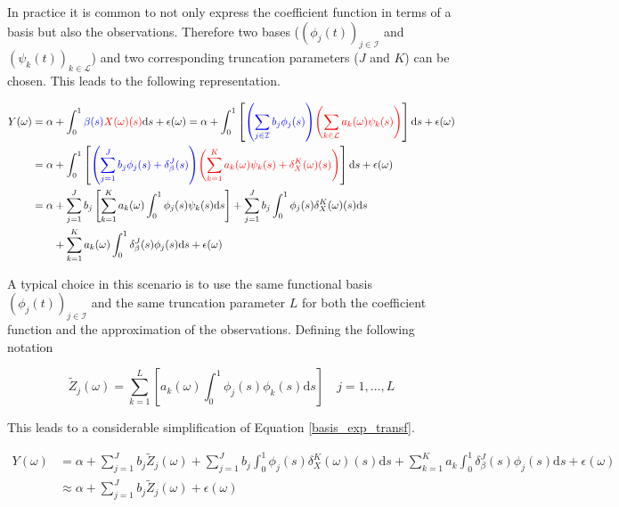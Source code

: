 \documentclass[11pt,twoside,a4paper]{article}
\begin{document}
	In practice it is common to not only express the coefficient function in terms of a basis but also the observations. Therefore two bases ($\left(\phi_j(t)\right)_{j \in \mathcal{I}}$ and $\left(\psi_k(t)\right)_{k \in \mathcal{L}}$) and two corresponding truncation parameters ($J$ and $K$) can be chosen. This leads to the following representation.
	
	\begin{equation}\label{basis_exp_transf}
		\begin{split}
			Y(\omega) & = \alpha + \int_{0}^{1} {\color{blue}\beta(s)} {\color{red}X(\omega)(s)}\mathrm{d}s + \epsilon(\omega)
			 = \alpha + \int_{0}^{1}\left[{\color{blue}\left(\sum_{j \in \mathcal{I}} b_j  \phi_j(s)\right)} {\color{red}\left(\sum_{k \in \mathcal{L}} a_k(\omega)  \psi_k(s)\right)} \right]\mathrm{d}s + \epsilon(\omega) \\
			& = \alpha + \int_{0}^{1}\left[{\color{blue}\left(\sum_{j = 1}^{J} b_j  \phi_j(s) + \delta_{\beta}^{J}(s)\right)} {\color{red}\left(\sum_{k = 1}^K a_k(\omega)  \psi_k(s) + \delta_{X}^{K}(\omega)(s)\right)} \right]\mathrm{d}s + \epsilon(\omega)\\
			& = \alpha + \sum_{j = 1}^J b_j \left[\sum_{k = 1}^K a_k(\omega) \int_{0}^{1} \phi_j(s) \psi_k(s) \mathrm{d}s\right] + \sum_{j = 1}^{J} b_j  \int_{0}^{1} \phi_j(s) \delta_{X}^{K}(\omega)(s) \mathrm{d}s\\
			& \quad \quad + \sum_{k = 1}^{K} a_k(\omega)  \int_{0}^{1} \delta_{\beta}^{J}(s)\phi_j(s) \mathrm{d}s + \epsilon(\omega)
		\end{split}
	\end{equation}

	A typical choice in this scenario is to use the same functional basis $\left(\phi_j(t)\right)_{j \in \mathcal{I}}$ and the same truncation parameter $L$ for both the coefficient function and the approximation of the observations. Defining the following notation 

	\begin{equation}
			\tilde{Z}_j(\omega) = \sum_{k = 1}^{L} \left[a_k(\omega) \int_{0}^{1} \phi_j(s) \phi_k(s) \mathrm{d}s \right] \quad j = 1, \dots, L
	\end{equation}

	This leads to a considerable simplification of Equation \ref{basis_exp_transf}.
	
	\begin{equation}\label{simplified_model_basis_equation}
		\begin{split}
			Y(\omega) &= \alpha + \sum_{j = 1}^{J} b_j \tilde{Z}_j(\omega) + \sum_{j = 1}^{J} b_j  \int_{0}^{1} \phi_j(s) \delta_{X}^{K}(\omega)(s) \mathrm{d}s + \sum_{k = 1}^{K} a_k  \int_{0}^{1} \delta_{\beta}^{J}(s)\phi_j(s) \mathrm{d}s + \epsilon(\omega) \\
			& \approx \alpha + \sum_{j = 1}^{J} b_j \tilde{Z}_j(\omega) + \epsilon(\omega)
		\end{split}
	\end{equation}
\end{document}
